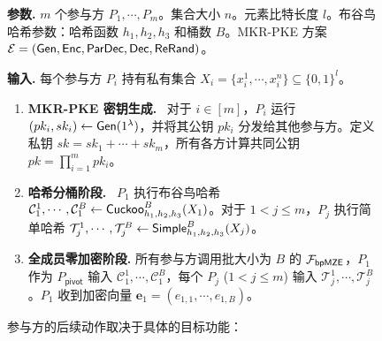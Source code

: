 \begin{figure}[!htb]
\begin{framed}
\begin{minipage}[c]{\textwidth}
\textbf{参数.} $m$ 个参与方 $P_1, \cdots, P_m$。集合大小 $n$。元素比特长度 $l$。布谷鸟哈希参数：哈希函数 $h_1, h_2, h_3$ 和桶数 $B$。MKR-PKE 方案 $\mathcal{E} = (\mathsf{Gen}, \mathsf{Enc}, \mathsf{ParDec}, \mathsf{Dec}, \mathsf{ReRand})$。

\textbf{输入.} 每个参与方 $P_i$ 持有私有集合 $X_i = \{x_i^1,\cdots, x_i^n\} \subseteq \{0,1\}^l$。

\begin{enumerate}[itemsep=2pt,topsep=0pt,parsep=0pt]
\item \textbf{MKR-PKE 密钥生成.}~\label{step:key-gen} 对于 $i \in [m]$，$P_i$ 运行 $(pk_i, sk_i) \gets \mathsf{Gen}(1^\lambda)$，并将其公钥 $pk_i$ 分发给其他参与方。定义私钥 $sk = sk_1 + \cdots + sk_m$，所有各方计算共同公钥 $pk= \prod_{i =1}^m pk_i$。
\item \textbf{哈希分桶阶段.}~\label{step:hash} $P_1$ 执行布谷鸟哈希 $\mathcal{C}_1^1, \cdots, \mathcal{C}_1^B \gets \mathsf{Cuckoo}_{h_1,h_2,h_3}^B(X_1)$。对于 $1 < j  \le m$，$P_j$ 执行简单哈希 $\mathcal{T}_j^1, \cdots, \mathcal{T}_j^B \gets \mathsf{Simple}_{h_1,h_2,h_3}^B(X_j)$。
\item \textbf{全成员零加密阶段.} 所有参与方调用批大小为 $B$ 的 $\mathcal{F}_\mathsf{bpMZE}$，$P_1$ 作为 $P_\mathsf{pivot}$ 输入 $\mathcal{C}_1^1, \cdots, \mathcal{C}_1^B$，每个 $P_j$ ($1 < j  \le m$) 输入 $\mathcal{T}_j^1, \cdots, \mathcal{T}_j^B$。$P_1$ 收到加密向量 $\textbf{e}_1=(e_{1,1},\cdots,e_{1,B})$。
\end{enumerate}

参与方的后续动作取决于具体的目标功能：


\end{minipage}
\end{framed}
\end{figure}
